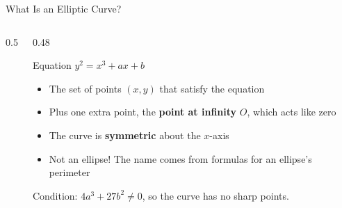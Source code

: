 \documentclass[aspectratio=169,11pt,xcolor={table}]{beamer}
\begin{document}
\begin{frame}{What Is an Elliptic Curve?}
  \begin{columns}[c]
    \begin{column}{0.5\textwidth}
      \centering
    \end{column}
    \begin{column}{0.48\textwidth}
      \begin{block}{Equation}
        \centering $y^{2} = x^{3} + ax + b$
      \end{block}
      \begin{itemize}\small\setlength{\itemsep}{3pt}
        \item The set of points $(x, y)$ that satisfy the equation
        \item Plus one extra point, the \textbf{point at infinity} $O$, which acts like zero
        \item The curve is \textbf{symmetric} about the $x$-axis
        \item Not an ellipse! The name comes from formulas for an ellipse's perimeter
      \end{itemize}
      {\small Condition: $4a^3 + 27b^2 \neq 0$, so the curve has no sharp points.}
    \end{column}
  \end{columns}
\end{frame}
\end{document}

